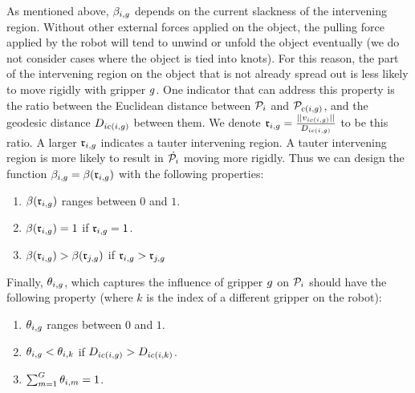 As mentioned above, $\beta_{i, g}$ depends on the current slackness of the intervening region. Without other external forces applied on the object, the pulling force applied by the robot will tend to unwind or unfold the object eventually (we do not consider cases where the object is tied into knots). For this reason,  the part of the intervening region on the object that is not already spread out is less likely to move rigidly with gripper $g$. One indicator that can address this property is the ratio between the Euclidean distance between $\mathcal{P}_i$ and $\mathcal{P}_{c(i, g)}$, and the geodesic distance $D_{i c(i, g)}$ between them. We denote $\mathfrak{r}_{i, g} = \frac{||v_{i c(i, g)}||}{D_{i c(i, g)}}$ to be this ratio. A larger $\mathfrak{r}_{i, g}$ indicates a tauter intervening region. A tauter intervening region is more likely to result in $\dot{\mathcal{P}_i}$ moving more rigidly. Thus we can design the function $\beta_{i, g} = \beta(\mathfrak{r}_{i, g})$ with the following properties:
\begin{enumerate}
    \item $\beta(\mathfrak{r}_{i, g})$ ranges between $0$ and $1$.
    \item $\beta(\mathfrak{r}_{i, g}) = 1$ if $\mathfrak{r}_{i, g} = 1$.
    \item $\beta(\mathfrak{r}_{i, g}) > \beta(\mathfrak{r}_{j, g})$ if $\mathfrak{r}_{i, g} > \mathfrak{r}_{j, g}$
\end{enumerate}

Finally, $\theta_{i, g}$, which captures the influence of gripper $g$ on $\mathcal{P}_i$ should have the following property (where $k$ is the index of a different gripper on the robot):
\begin{enumerate}
    \item $\theta_{i, g}$ ranges between $0$ and $1$.
    \item $\theta_{i, g} < \theta_{i, k}$ if $D_{i c(i, g)} > D_{i c(i, k)}$.
    \item $\sum_{m = 1}^{G} \theta_{i, m} = 1$.
\end{enumerate}

